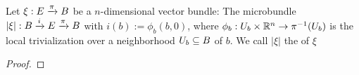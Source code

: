  \\
Let $\xi: E \xto{\pi} B$ be a $n$-dimensional vector bundle:
The microbundle $\lvert \xi \rvert: \bundle{B}{E}{i}{\pi}$ with $i(b) := \phi_b(b, 0)$, where
$\phi_b: U_b \times \R^n \to \pi^{-1}(U_b)$ is the local trivialization over a
neighborhood $U_b \sub B$ of $b$. We call $\lvert \xi \rvert$ the  of $\xi$
\begin{proof}
\end{proof}